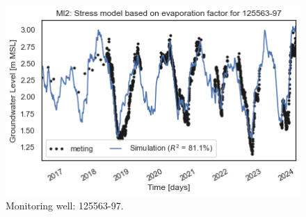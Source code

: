 \begin{figure}[htbp]
\begin{minipage}{0.32\textwidth}
        \includegraphics[width=\linewidth]{frontmatter/Heijplaat-fig/125563-97.png}
        \caption{Monitoring well: 125563-97.}
        \label{SM: 125563-97}
    \end{minipage}
\end{figure}

